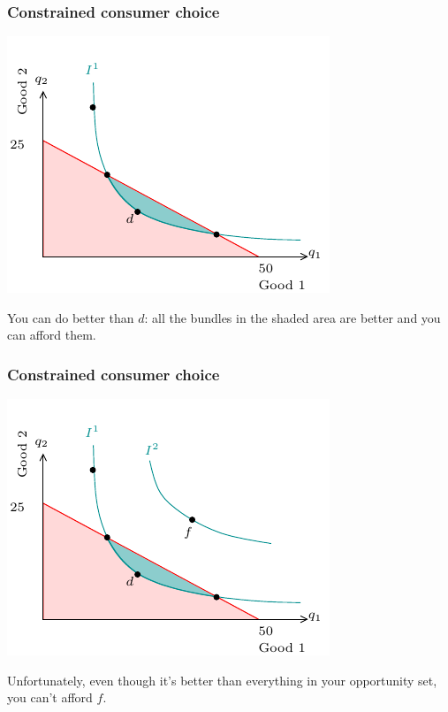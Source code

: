 \documentclass[xcolor=pdftex,dvipsnames]{beamer}
\begin{document}
\begin{frame}
\frametitle{Constrained consumer choice}
\begin{center}\includegraphics{pics/ConstrainedChoice1}\end{center}
You can do better than $d$: all the bundles in the
{\color{SeaGreen}shaded} area are better and you can afford them.\end{frame}


\begin{frame}
\frametitle{Constrained consumer choice}
\begin{center}\includegraphics{pics/ConstrainedChoice2}\end{center}
Unfortunately, even though it's better than everything in
your opportunity set, you can't afford $f$. 
\end{frame}
\end{document}
